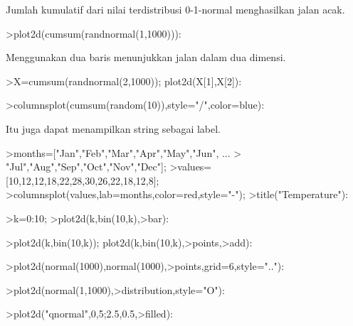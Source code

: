 \documentclass[a4paper,10pt]{article}
\begin{document}
\begin{eulernotebook}
\begin{eulercomment}
\begin{eulercomment}
\begin{eulercomment}
\begin{eulercomment}
\begin{eulercomment}
\begin{eulercomment}
\begin{eulercomment}
\begin{eulercomment}
\begin{eulercomment}
Jumlah kumulatif dari nilai terdistribusi 0-1-normal menghasilkan
jalan acak.
\end{eulercomment}
\begin{eulerprompt}
>plot2d(cumsum(randnormal(1,1000))):
\end{eulerprompt}
\begin{eulercomment}
Menggunakan dua baris menunjukkan jalan dalam dua dimensi.
\end{eulercomment}
\begin{eulerprompt}
>X=cumsum(randnormal(2,1000)); plot2d(X[1],X[2]):
\end{eulerprompt}
\begin{eulerprompt}
>columnsplot(cumsum(random(10)),style="/",color=blue):
\end{eulerprompt}
\begin{eulercomment}
Itu juga dapat menampilkan string sebagai label.
\end{eulercomment}
\begin{eulerprompt}
>months=["Jan","Feb","Mar","Apr","May","Jun", ...
>  "Jul","Aug","Sep","Oct","Nov","Dec"];
>values=[10,12,12,18,22,28,30,26,22,18,12,8];
>columnsplot(values,lab=months,color=red,style="-");
>title("Temperature"):
\end{eulerprompt}
\begin{eulerprompt}
>k=0:10;
>plot2d(k,bin(10,k),>bar):
\end{eulerprompt}
\begin{eulerprompt}
>plot2d(k,bin(10,k)); plot2d(k,bin(10,k),>points,>add):
\end{eulerprompt}
\begin{eulerprompt}
>plot2d(normal(1000),normal(1000),>points,grid=6,style=".."):
\end{eulerprompt}
\begin{eulerprompt}
>plot2d(normal(1,1000),>distribution,style="O"):
\end{eulerprompt}
\begin{eulerprompt}
>plot2d("qnormal",0,5;2.5,0.5,>filled):
\end{eulerprompt}

\end{eulercomment}
\end{eulercomment}
\end{eulercomment}
\end{eulercomment}
\end{eulercomment}
\end{eulercomment}
\end{eulercomment}
\end{eulercomment}
\end{eulernotebook}
\end{document}
